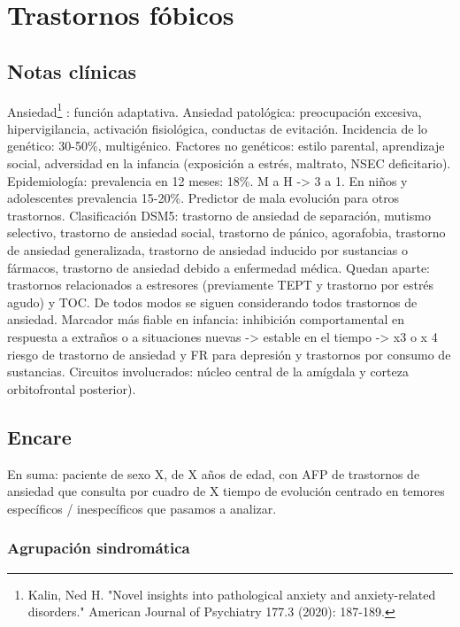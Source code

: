 \chapter*{Trastornos fóbicos}
\section*{Notas clínicas}
Ansiedad\footnote{Kalin, Ned H. "Novel insights into pathological anxiety and anxiety-related disorders." American Journal of Psychiatry 177.3 (2020): 187-189.} : función adaptativa.
Ansiedad patológica: preocupación excesiva, hipervigilancia, activación fisiológica, conductas de evitación.
Incidencia de lo genético: 30-50\%, multigénico.
Factores no genéticos: estilo parental, aprendizaje social, adversidad en la infancia (exposición a estrés, maltrato, NSEC deficitario).
Epidemiología: prevalencia en 12 meses: 18\%. M a H -> 3 a 1. En niños y adolescentes prevalencia 15-20\%. 
Predictor de mala evolución para otros trastornos.
Clasificación DSM5: trastorno de ansiedad de separación, mutismo selectivo, trastorno de ansiedad social, trastorno de pánico, agorafobia, trastorno de ansiedad generalizada, trastorno de ansiedad inducido por sustancias o fármacos, trastorno de ansiedad debido a enfermedad médica.
Quedan aparte: trastornos relacionados a estresores (previamente TEPT y trastorno por estrés agudo) y TOC.
De todos modos se siguen considerando todos trastornos de ansiedad.
Marcador más fiable en infancia: inhibición comportamental en respuesta a extraños o a situaciones nuevas -> estable en el tiempo -> x3 o x 4 riesgo de trastorno de ansiedad y FR para depresión y trastornos por consumo de sustancias.
Circuitos involucrados: núcleo central de la amígdala y corteza orbitofrontal posterior).
\section*{Encare}
En suma: paciente de sexo X, de X años de edad, con AFP de trastornos de ansiedad que consulta por cuadro de X tiempo de evolución centrado en temores específicos / inespecíficos que pasamos a analizar.
\subsection*{Agrupación sindromática}
